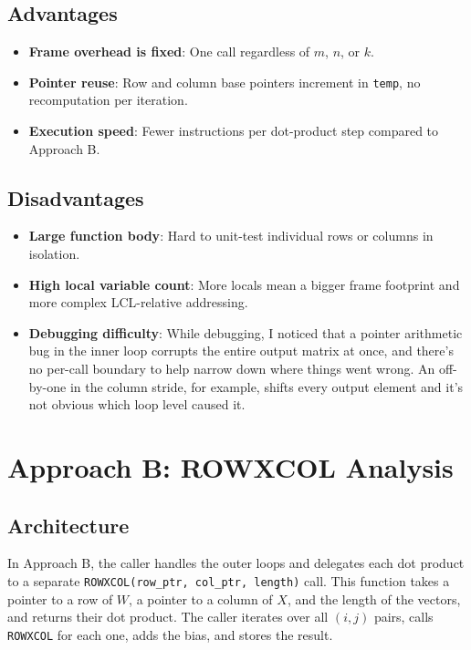 \documentclass[12pt,a4paper]{article}
\begin{document}
\subsection{Advantages}

\begin{itemize}
    \item \textbf{Frame overhead is fixed}: One call regardless of $m$, $n$, or $k$.
    \item \textbf{Pointer reuse}: Row and column base pointers increment in \texttt{temp}, no recomputation per iteration.
    \item \textbf{Execution speed}: Fewer instructions per dot-product step compared to Approach B.
\end{itemize}

\subsection{Disadvantages}

\begin{itemize}
    \item \textbf{Large function body}: Hard to unit-test individual rows or columns in isolation.
    \item \textbf{High local variable count}: More locals mean a bigger frame footprint and more complex LCL-relative addressing.
    \item \textbf{Debugging difficulty}: While debugging, I noticed that a pointer arithmetic bug in the inner loop corrupts the entire output matrix at once, and there's no per-call boundary to help narrow down where things went wrong. An off-by-one in the column stride, for example, shifts every output element and it's not obvious which loop level caused it.
\end{itemize}

\section{Approach B: ROWXCOL Analysis}

\subsection{Architecture}

In Approach B, the caller handles the outer loops and delegates each dot product to a separate \texttt{ROWXCOL(row\_ptr, col\_ptr, length)} call. This function takes a pointer to a row of $W$, a pointer to a column of $X$, and the length of the vectors, and returns their dot product. The caller iterates over all $(i, j)$ pairs, calls \texttt{ROWXCOL} for each one, adds the bias, and stores the result.
\end{document}
